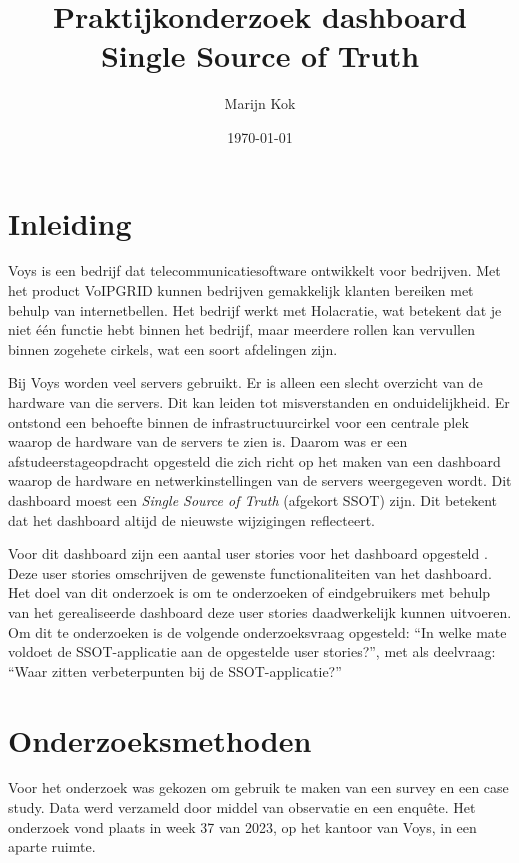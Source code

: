 \documentclass[a4paper, dutch]{article}
\title{Praktijkonderzoek dashboard Single Source of Truth}
\author{Marijn Kok}
\date{\today}
\begin{document}
\maketitle


\section{Inleiding}

Voys is een bedrijf dat telecommunicatiesoftware ontwikkelt voor bedrijven. Met het product VoIPGRID kunnen bedrijven gemakkelijk klanten bereiken met behulp van internetbellen. Het bedrijf werkt met Holacratie, wat betekent dat je niet één functie hebt binnen het bedrijf, maar meerdere rollen kan vervullen binnen zogehete cirkels, wat een soort afdelingen zijn.

Bij Voys worden veel servers gebruikt. Er is alleen een slecht overzicht van de hardware van die servers. Dit kan leiden tot misverstanden en onduidelijkheid. Er ontstond een behoefte binnen de infrastructuurcirkel voor een centrale plek waarop de hardware van de servers te zien is. Daarom was er een afstudeerstageopdracht opgesteld die zich richt op het maken van een dashboard waarop de hardware en netwerkinstellingen van de servers weergegeven wordt. Dit dashboard moest een \textit{Single Source of Truth} (afgekort SSOT) zijn. Dit betekent dat het dashboard altijd de nieuwste wijzigingen reflecteert.

Voor dit dashboard zijn een aantal user stories voor het dashboard opgesteld \parencite{user_stories}. Deze user stories omschrijven de gewenste functionaliteiten van het dashboard. Het doel van dit onderzoek is om te onderzoeken of eindgebruikers met behulp van het gerealiseerde dashboard deze user stories daadwerkelijk kunnen uitvoeren. Om dit te onderzoeken is de volgende onderzoeksvraag opgesteld: ``In welke mate voldoet de SSOT-applicatie aan de opgestelde user stories?'', met als deelvraag: ``Waar zitten verbeterpunten bij de SSOT-applicatie?''

\section{Onderzoeksmethoden}
\label{sec:research_methods}

Voor het onderzoek was gekozen om gebruik te maken van een survey en een case study. Data werd verzameld door middel van observatie en een enquête. Het onderzoek vond plaats in week 37 van 2023, op het kantoor van Voys, in een aparte ruimte.
\end{document}
